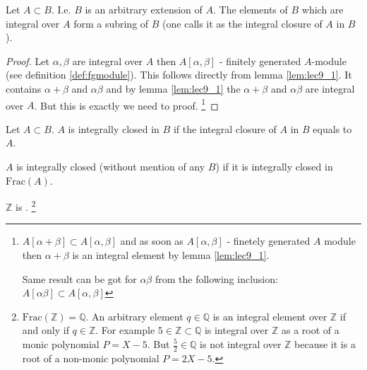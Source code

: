 \begin{proposition}
  Let $A \subset B$. I.e. $B$ is an arbitrary extension of $A$. The
  elements of $B$ which are integral over $A$ form a subring of $B$
  (one calls it as the integral closure of $A$ in $B$).
  \begin{proof}
    Let $\alpha, \beta$ are integral over $A$ then $A\left[\alpha,
      \beta\right]$ - finitely generated $A$-module (see definition
    \ref{def:fgmodule}). This follows directly from lemma
    \ref{lem:lec9_1}. It contains $\alpha + \beta$ and $\alpha \beta$
    and by lemma \ref{lem:lec9_1} the $\alpha + \beta$ and $\alpha
    \beta$ are integral over $A$. But this is exactly we need to
    proof.
    \footnote{
      $A\left[\alpha + \beta\right] \subset A\left[\alpha,
      \beta\right]$ and as soon as $A\left[\alpha,
        \beta\right]$ - finetely generated $A$ module then
      $\alpha+\beta$ is an integral element by lemma \ref{lem:lec9_1}.

      Same result can be got for $\alpha \beta$ from the following
      inclusion:  $A\left[\alpha \beta\right] \subset A\left[\alpha,
      \beta\right]$
    }
  \end{proof}
  \label{prop:lec9_3}
\end{proposition}

\begin{definition}
  Let $A \subset B$. $A$ is integrally closed in $B$ if the integral
  closure of $A$ in $B$ equals to $A$.

  $A$ is integrally closed (without mention of any $B$) if it is
  integrally closed in  $\mathrm {Frac}(A)$.
  \label{def:integrallyclosed}
\end{definition}

\begin{example}
  $\mathbb{Z}$ is .
  \footnote{
    $\mathrm {Frac}(\mathbb{Z}) = \mathbb{Q}$. An arbitrary element
    $q \in \mathbb{Q}$ is an integral element over
    $\mathbb{Z}$ if and only if $q \in \mathbb{Z}$. For example
    $5 \in \mathbb{Z} \subset \mathbb{Q}$ is integral over $\mathbb{Z}$ as a root of a
    monic polynomial $P = X - 5$. But $\frac{5}{2} \in \mathbb{Q}$ is
    not integral over $\mathbb{Z}$ because it is a root of a non-monic
    polynomial $P = 2 X - 5$.
  }
\end{example}

